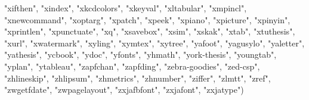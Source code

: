 \documentclass[
]{article}
\newenvironment{Shaded}{\begin{snugshade}}{\end{snugshade}}
\newcommand{\NormalTok}[1]{#1}
\newcommand{\StringTok}[1]{\textcolor[rgb]{0.31,0.60,0.02}{#1}}
\begin{document}
\begin{Shaded}
\begin{Highlighting}[]
\StringTok{"xifthen"}\NormalTok{, }\StringTok{"xindex"}\NormalTok{, }\StringTok{"xkcdcolors"}\NormalTok{, }\StringTok{"xkeyval"}\NormalTok{, }\StringTok{"xltabular"}\NormalTok{, }\StringTok{"xmpincl"}\NormalTok{, }
\StringTok{"xnewcommand"}\NormalTok{, }\StringTok{"xoptarg"}\NormalTok{, }\StringTok{"xpatch"}\NormalTok{, }\StringTok{"xpeek"}\NormalTok{, }\StringTok{"xpiano"}\NormalTok{, }\StringTok{"xpicture"}\NormalTok{, }
\StringTok{"xpinyin"}\NormalTok{, }\StringTok{"xprintlen"}\NormalTok{, }\StringTok{"xpunctuate"}\NormalTok{, }\StringTok{"xq"}\NormalTok{, }\StringTok{"xsavebox"}\NormalTok{, }\StringTok{"xsim"}\NormalTok{, }
\StringTok{"xskak"}\NormalTok{, }\StringTok{"xtab"}\NormalTok{, }\StringTok{"xtuthesis"}\NormalTok{, }\StringTok{"xurl"}\NormalTok{, }\StringTok{"xwatermark"}\NormalTok{, }\StringTok{"xyling"}\NormalTok{, }
\StringTok{"xymtex"}\NormalTok{, }\StringTok{"xytree"}\NormalTok{, }\StringTok{"yafoot"}\NormalTok{, }\StringTok{"yagusylo"}\NormalTok{, }\StringTok{"yaletter"}\NormalTok{, }\StringTok{"yathesis"}\NormalTok{, }
\StringTok{"ycbook"}\NormalTok{, }\StringTok{"ydoc"}\NormalTok{, }\StringTok{"yfonts"}\NormalTok{, }\StringTok{"yhmath"}\NormalTok{, }\StringTok{"york{-}thesis"}\NormalTok{, }\StringTok{"youngtab"}\NormalTok{, }
\StringTok{"yplan"}\NormalTok{, }\StringTok{"ytableau"}\NormalTok{, }\StringTok{"zapfchan"}\NormalTok{, }\StringTok{"zapfding"}\NormalTok{, }\StringTok{"zebra{-}goodies"}\NormalTok{, }
\StringTok{"zed{-}csp"}\NormalTok{, }\StringTok{"zhlineskip"}\NormalTok{, }\StringTok{"zhlipsum"}\NormalTok{, }\StringTok{"zhmetrics"}\NormalTok{, }\StringTok{"zhnumber"}\NormalTok{, }
\StringTok{"ziffer"}\NormalTok{, }\StringTok{"zlmtt"}\NormalTok{, }\StringTok{"zref"}\NormalTok{, }\StringTok{"zwgetfdate"}\NormalTok{, }\StringTok{"zwpagelayout"}\NormalTok{, }\StringTok{"zxjafbfont"}\NormalTok{, }
\StringTok{"zxjafont"}\NormalTok{, }\StringTok{"zxjatype"}\NormalTok{)}
\end{Highlighting}
\end{Shaded}
\end{document}
